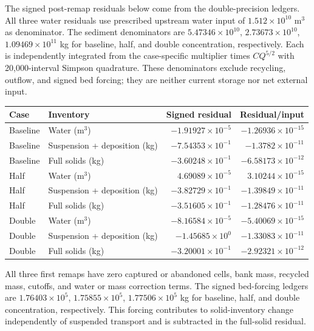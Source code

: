 The signed post-remap residuals below come from the double-precision
ledgers. All three water residuals use prescribed upstream water input
of $1.512\times10^{10}$ m$^3$ as denominator. The sediment denominators are
$5.47346\times10^{10}$, $2.73673\times10^{10}$, $1.09469\times10^{11}$ kg for baseline, half, and double concentration, respectively.
Each is independently integrated from the case-specific multiplier
times $CQ^{5/2}$ with 20,000-interval Simpson quadrature. These
denominators exclude recycling, outflow, and signed bed forcing;
they are neither current storage nor net external input.

\begin{center}\small\setlength{\tabcolsep}{4pt}
\begin{tabular}{llrr}
\toprule
Case & Inventory & Signed residual & Residual/input \\
\midrule
Baseline & Water (m$^3$) & $-1.91927\times10^{-5}$ & $-1.26936\times10^{-15}$ \\
Baseline & Suspension + deposition (kg) & $-7.54353\times10^{-1}$ & $-1.3782\times10^{-11}$ \\
Baseline & Full solids (kg) & $-3.60248\times10^{-1}$ & $-6.58173\times10^{-12}$ \\
Half & Water (m$^3$) & $4.69089\times10^{-5}$ & $3.10244\times10^{-15}$ \\
Half & Suspension + deposition (kg) & $-3.82729\times10^{-1}$ & $-1.39849\times10^{-11}$ \\
Half & Full solids (kg) & $-3.51605\times10^{-1}$ & $-1.28476\times10^{-11}$ \\
Double & Water (m$^3$) & $-8.16584\times10^{-5}$ & $-5.40069\times10^{-15}$ \\
Double & Suspension + deposition (kg) & $-1.45685\times10^{0}$ & $-1.33083\times10^{-11}$ \\
Double & Full solids (kg) & $-3.20001\times10^{-1}$ & $-2.92321\times10^{-12}$ \\
\bottomrule\end{tabular}\end{center}
All three first remaps have zero captured or abandoned cells, bank mass,
recycled mass, cutoffs, and water or mass correction terms. The
signed bed-forcing ledgers are $1.76403\times10^{5}$, $1.75855\times10^{5}$, $1.77506\times10^{5}$ kg for baseline, half, and double
concentration, respectively. This forcing contributes to solid-inventory
change independently of suspended transport and is subtracted in
the full-solid residual.

